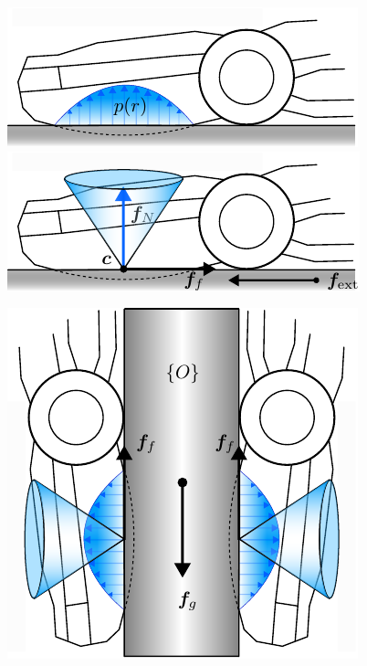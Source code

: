 \begin{center}
    \renewcommand{\arraystretch}{1.2}
    \begin{minipage}{.48\linewidth}
        \vspace{0pt}
        \centering
        \includegraphics[width=.95\textwidth]{chapters/modeling/fig/contact-surface.pdf}%
        \vspace{0.6cm}
        \includegraphics[width=.95\textwidth]{chapters/modeling/fig/friction-cone-schematic-crop.pdf}%
    \end{minipage}%
    \hfill%
    \begin{minipage}{.48\linewidth}
        \vspace{0pt}
        \centering
        \includegraphics[width=.95\textwidth]{chapters/modeling/fig/force-closure-schematic-crop.pdf}

\end{minipage}
\end{center}
